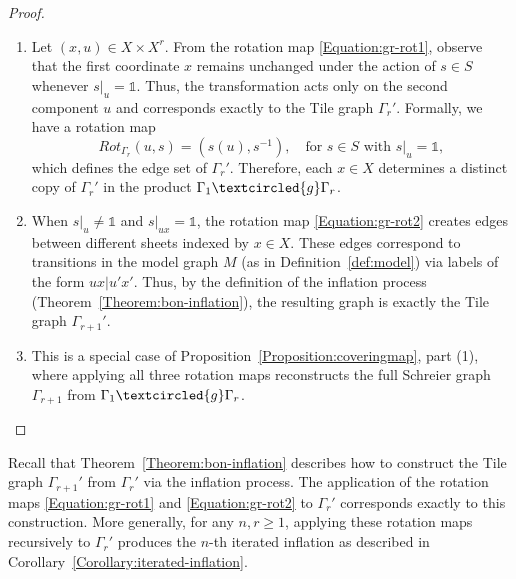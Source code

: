 \documentclass{article}
\newcommand{\G}{\Gamma}
\newcommand{\id}{\mathds{1}}
\newcommand{\g}{\textcircled{g}}
\begin{document}
\begin{proof}
\begin{enumerate}
    \item Let $(x,u) \in X \times X^r$. From the rotation map \eqref{Equation:gr-rot1}, observe that the first coordinate $x$ remains unchanged under the action of $s \in S$ whenever $s|_u = \id$. Thus, the transformation acts only on the second component $u$ and corresponds exactly to the Tile graph $\G_r'$. Formally, we have a rotation map 
    \[
    Rot_{\G_r}(u, s) = (s(u), s^{-1}), \quad \text{for } s \in S \text{ with } s|_u = \id,
    \]
    which defines the edge set of $\G_r'$. Therefore, each $x \in X$ determines a distinct copy of $\G_r'$ in the product $\G_1 \g \G_r$.
    
    \item When $s|_u \neq \id$ and $s|_{ux} = \id$, the rotation map \eqref{Equation:gr-rot2} creates edges between different sheets indexed by $x \in X$. These edges correspond to transitions in the model graph $M$ (as in Definition~\ref{def:model}) via labels of the form $ux | u'x'$. Thus, by the definition of the inflation process (Theorem~\ref{Theorem:bon-inflation}), the resulting graph is exactly the Tile graph $\G_{r+1}'$.
    
    \item This is a special case of Proposition~\ref{Proposition:coveringmap}, part (1), where applying all three rotation maps reconstructs the full Schreier graph $\G_{r+1}$ from $\G_1 \g \G_r$.
\end{enumerate}
\end{proof}

Recall that Theorem~\ref{Theorem:bon-inflation} describes how to construct the Tile graph $\G_{r+1}'$ from $\G_r'$ via the inflation process. The application of the rotation maps \eqref{Equation:gr-rot1} and \eqref{Equation:gr-rot2} to $\G_r'$ corresponds exactly to this construction. More generally, for any $n, r \geq 1$, applying these rotation maps recursively to $\G_r'$ produces the $n$-th iterated inflation as described in Corollary~\ref{Corollary:iterated-inflation}.
\end{document}
